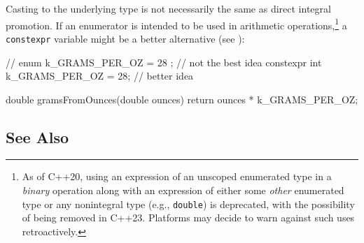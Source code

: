 %
%
%
%

Casting to the underlying type is not necessarily the same as direct integral promotion. If
an enumerator is intended to be used in arithmetic operations,\footnote{As of C++20, using an expression of an unscoped enumerated type in a \emph{binary} operation along with
an expression of either some \emph{other} enumerated type or any nonintegral type (e.g.,
\lstinline!double!) is deprecated, with the possibility of being removed in C++23. Platforms
may decide to warn against such uses retroactively.} a \lstinline!constexpr! variable might
be a better alternative (see ):

\begin{emcppslisting}
// enum { k_GRAMS_PER_OZ = 28 };    // not the best idea
constexpr int k_GRAMS_PER_OZ = 28;  // better idea

double gramsFromOunces(double ounces)
{
    return ounces * k_GRAMS_PER_OZ;
}
\end{emcppslisting}


\subsection[See Also]{See Also}\label{see-also}

